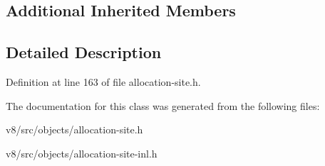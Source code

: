 \subsection*{Additional Inherited Members}


\subsection{Detailed Description}


Definition at line 163 of file allocation-\/site.\+h.



The documentation for this class was generated from the following files\+:\begin{DoxyCompactItemize}
\item 
v8/src/objects/allocation-\/site.\+h\item 
v8/src/objects/allocation-\/site-\/inl.\+h\end{DoxyCompactItemize}
